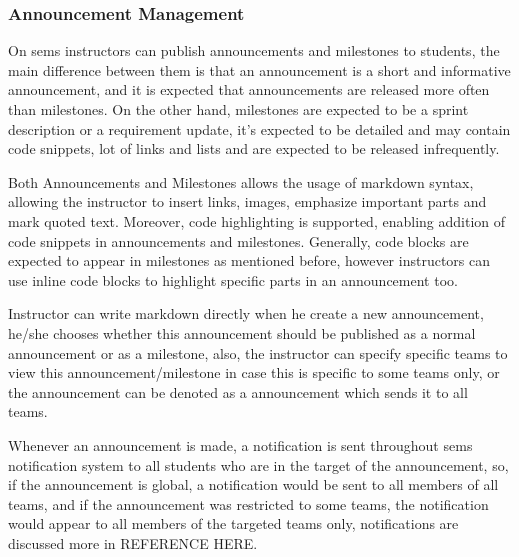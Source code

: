 \subsubsection{Announcement Management}
\label{subs:announcement-management}
On \ac{sems} instructors can publish announcements and milestones to students, the main difference between them
is that an announcement is a short and informative announcement, and it is expected that announcements are released
more often than milestones. On the other hand, milestones are expected to be a sprint description or a requirement update,
it's expected to be detailed and may contain code snippets, lot of links and lists and are expected to be released infrequently.

\newParagraph
Both Announcements and Milestones allows the usage of markdown syntax, allowing the instructor to insert links, images, emphasize important
parts and mark quoted text. Moreover, code highlighting is supported, enabling addition of code snippets in announcements and milestones. Generally,
code blocks are expected to appear in milestones as mentioned before, however instructors can use inline code blocks to highlight specific parts
in an announcement too.

\newParagraph
Instructor can write markdown directly when he create a new announcement, he/she chooses whether this announcement should be published
as a normal announcement or as a milestone, also, the instructor can specify specific teams to view this announcement/milestone in case
this is specific to some teams only, or the announcement can be denoted as a  announcement which sends it to all
teams.

\newParagraph
Whenever an announcement is made, a notification is sent throughout \ac{sems} notification system to all students who are in the target
of the announcement, so, if the announcement is global, a notification would be sent to all members of all teams, and if the announcement
was restricted to some teams, the notification would appear to all members of the targeted teams only, notifications are discussed more in
REFERENCE HERE.
